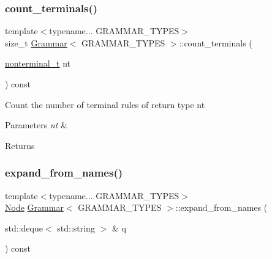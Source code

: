 \subsubsection{\texorpdfstring{count\+\_\+terminals()}{count\_terminals()}}
{\footnotesize\ttfamily template$<$typename... G\+R\+A\+M\+M\+A\+R\+\_\+\+T\+Y\+P\+ES$>$ \\
size\+\_\+t \hyperlink{class_grammar}{Grammar}$<$ G\+R\+A\+M\+M\+A\+R\+\_\+\+T\+Y\+P\+ES $>$\+::count\+\_\+terminals (\begin{DoxyParamCaption}\item[{\hyperlink{_nonterminal_8h_a1c5bfe9b903f69c83bbde5da7035fef3}{nonterminal\+\_\+t}}]{nt }\end{DoxyParamCaption}) const\hspace{0.3cm}{\ttfamily [inline]}}

Count the number of terminal rules of return type nt 
\begin{DoxyParams}{Parameters}
{\em nt} & \\
\hline
\end{DoxyParams}
\begin{DoxyReturn}{Returns}

\end{DoxyReturn}
\mbox{\label{class_grammar_aef582b15696b97c3376cba935a76acef}} 
\subsubsection{\texorpdfstring{expand\+\_\+from\+\_\+names()}{expand\_from\_names()}\hspace{0.1cm}{\footnotesize\ttfamily [1/3]}}
{\footnotesize\ttfamily template$<$typename... G\+R\+A\+M\+M\+A\+R\+\_\+\+T\+Y\+P\+ES$>$ \\
\hyperlink{class_node}{Node} \hyperlink{class_grammar}{Grammar}$<$ G\+R\+A\+M\+M\+A\+R\+\_\+\+T\+Y\+P\+ES $>$\+::expand\+\_\+from\+\_\+names (\begin{DoxyParamCaption}\item[{std\+::deque$<$ std\+::string $>$ \&}]{q }\end{DoxyParamCaption}) const\hspace{0.3cm}{\ttfamily [inline]}}

